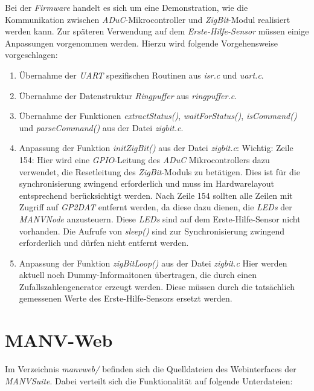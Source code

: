     Bei der \emph{Firmware} handelt es sich um eine Demonstration, wie die Kommunikation zwischen \emph{ADuC}-Mikrocontroller
    und \emph{ZigBit}-Modul realisiert werden kann. Zur späteren Verwendung auf dem \emph{Erste-Hilfe-Sensor} müssen 
    einige Anpassungen vorgenommen werden. Hierzu wird folgende Vorgehensweise vorgeschlagen:

    \begin{enumerate}
        \item Übernahme der \emph{UART} spezifischen Routinen aus \emph{isr.c} und \emph{uart.c}. 
        \item Übernahme der Datenstruktur \emph{Ringpuffer} aus \emph{ringpuffer.c}.
        \item Übernahme der Funktionen \emph{extractStatus()}, \emph{waitForStatus()}, \emph{isCommand()}
              und \emph{parseCommand()} aus der Datei \emph{zigbit.c}.
        \item Anpassung der Funktion \emph{initZigBit()} aus der Datei \emph{zigbit.c}:
              Wichtig: Zeile 154: Hier wird eine \emph{GPIO}-Leitung des \emph{ADuC} Mikrocontrollers dazu verwendet,
              die Resetleitung des \emph{ZigBit}-Moduls zu betätigen. Dies ist für die synchronisierung
              zwingend erforderlich und muss im Hardwarelayout entsprechend berücksichtigt werden.
              Nach Zeile 154 sollten alle Zeilen mit Zugriff auf \emph{GP2DAT} entfernt werden, 
              da diese dazu dienen, die \emph{LEDs} der \emph{MANVNode} anzusteuern. Diese \emph{LEDs} sind
              auf dem Erste-Hilfe-Sensor nicht vorhanden. Die Aufrufe von \emph{sleep()} sind zur Synchronisierung
              zwingend erforderlich und dürfen nicht entfernt werden.
        \item Anpassung der Funktion \emph{zigBitLoop()} aus der Datei \emph{zigbit.c} Hier werden aktuell noch 
              Dummy-Informaitonen übertragen, die durch einen Zufallszahlengenerator erzeugt werden. Diese
              müssen durch die tatsächlich gemessenen Werte des Erste-Hilfe-Sensors ersetzt werden.
    \end{enumerate}                


    \section{MANV-Web}
    Im Verzeichnis \emph{manvweb/} befinden sich die Quelldateien des Webinterfaces der
    \emph{MANVSuite}. Dabei verteilt sich die Funktionalität auf folgende Unterdateien:

